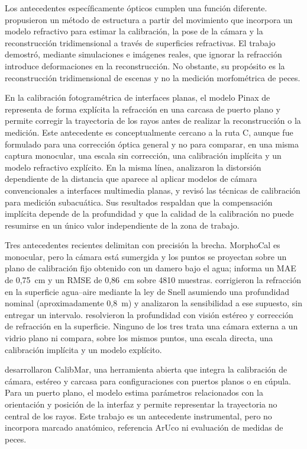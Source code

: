 \documentclass{report}
\begin{document}
Los antecedentes específicamente ópticos cumplen una función diferente. \textcite{Qiao2019} propusieron un método de estructura a partir del movimiento que incorpora un modelo refractivo para estimar la calibración, la pose de la cámara y la reconstrucción tridimensional a través de superficies refractivas. El trabajo demostró, mediante simulaciones e imágenes reales, que ignorar la refracción introduce deformaciones en la reconstrucción. No obstante, su propósito es la reconstrucción tridimensional de escenas y no la medición morfométrica de peces.

En la calibración fotogramétrica de interfaces planas, el modelo Pinax de \textcite{Luczynski2017} representa de forma explícita la refracción en una carcasa de puerto plano y permite corregir la trayectoria de los rayos antes de realizar la reconstrucción o la medición. Este antecedente es conceptualmente cercano a la ruta C, aunque fue formulado para una corrección óptica general y no para comparar, en una misma captura monocular, una escala sin corrección, una calibración implícita y un modelo refractivo explícito. En la misma línea, \textcite{Rofallski2022} analizaron la distorsión dependiente de la distancia que aparece al aplicar modelos de cámara convencionales a interfaces multimedia planas, y \textcite{Shortis2015} revisó las técnicas de calibración para medición subacuática. Sus resultados respaldan que la compensación implícita depende de la profundidad y que la calidad de la calibración no puede resumirse en un único valor independiente de la zona de trabajo.

Tres antecedentes recientes delimitan con precisión la brecha. MorphoCal \parencite{Vijayalakshmi2026} es monocular, pero la cámara está sumergida y los puntos se proyectan sobre un plano de calibración fijo obtenido con un damero bajo el agua; informa un MAE de 0,75~cm y un RMSE de 0,86~cm sobre 4810 muestras. \textcite{Yin2026} corrigieron la refracción en la superficie agua--aire mediante la ley de Snell asumiendo una profundidad nominal (aproximadamente 0,8~m) y analizaron la sensibilidad a ese supuesto, sin entregar un intervalo. \textcite{Zhou2023} resolvieron la profundidad con visión estéreo y corrección de refracción en la superficie. Ninguno de los tres trata una cámara externa a un vidrio plano ni compara, sobre los mismos puntos, una escala directa, una calibración implícita y un modelo explícito.

\textcite{Seegraber2025} desarrollaron CalibMar, una herramienta abierta que integra la calibración de cámara, estéreo y carcasa para configuraciones con puertos planos o en cúpula. Para un puerto plano, el modelo estima parámetros relacionados con la orientación y posición de la interfaz y permite representar la trayectoria no central de los rayos. Este trabajo es un antecedente instrumental, pero no incorpora marcado anatómico, referencia ArUco ni evaluación de medidas de peces.
\end{document}
